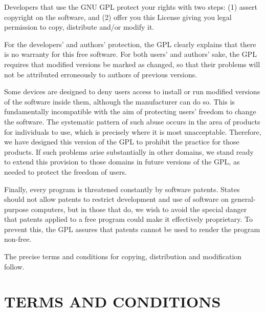 Developers that use the GNU GPL protect your rights with two steps: (1) assert copyright on the software, and (2) offer you this License giving you legal permission to copy, distribute and/or modify it.\par
For the developers' and authors' protection, the GPL clearly explains that there is no warranty for this free software. For both users' and authors' sake, the GPL requires that modified versions be marked as changed, so that their problems will not be attributed erroneously to authors of previous versions.\par
Some devices are designed to deny users access to install or run modified versions of the software inside them, although the manufacturer can do so. This is fundamentally incompatible with the aim of protecting users' freedom to change the software. The systematic pattern of such abuse occurs in the area of products for individuals to use, which is precisely where it is most unacceptable. Therefore, we have designed this version of the GPL to prohibit the practice for those products. If such problems arise substantially in other domains, we stand ready to extend this provision to those domains in future versions of the GPL, as needed to protect the freedom of users.\par
Finally, every program is threatened constantly by software patents. States should not allow patents to restrict development and use of software on general-purpose computers, but in those that do, we wish to avoid the special danger that patents applied to a free program could make it effectively proprietary. To prevent this, the GPL assures that patents cannot be used to render the program non-free.\par
The precise terms and conditions for copying, distribution and modification follow.
\section{TERMS AND CONDITIONS}
